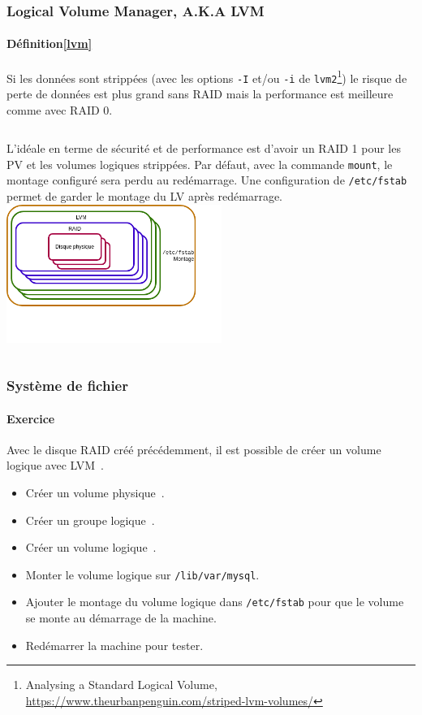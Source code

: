 \documentclass{beamer}
\begin{document}
    \begin{frame}
        \transdissolve
        \frametitle{Logical Volume Manager, A.K.A LVM}
        \framesubtitle{Définition\cref{lvm}}
        Si les données sont strippées (avec les options \lstinline{-I} et/ou \lstinline{-i} de \lstinline{lvm2}\footnote{Analysing a Standard Logical Volume, \url{https://www.theurbanpenguin.com/striped-lvm-volumes/}}) le risque de perte de données est plus grand sans RAID mais la performance est meilleure comme avec RAID 0.
        \bigbreak
        \begin{columns}
            L'idéale en terme de sécurité et de performance est d'avoir un RAID 1 pour les PV et les volumes logiques strippées.
            \bigbreak
            Par défaut, avec la commande \lstinline{mount}, le montage configuré sera perdu au redémarrage.
            Une configuration de \lstinline{/etc/fstab} permet de garder le montage du LV après redémarrage.
            \bigbreak
            \centering
            \includegraphics[width=7cm]{image/fs-stack.drawio}
        \end{columns}
    \end{frame}

    \begin{frame}
        \transdissolve
        \frametitle{Système de fichier}
        \framesubtitle{Exercice \execcounterdispinc}
        Avec le disque RAID créé précédemment, il est possible de créer un volume logique avec LVM~.
        \begin{itemize}
            \item Créer un volume physique~.
            \item Créer un groupe logique~.
            \item Créer un volume logique~.
            \item Monter le volume logique sur \lstinline{/lib/var/mysql}.
            \item Ajouter le montage du volume logique dans \lstinline{/etc/fstab} pour que le volume se monte au démarrage de la machine.
            \item Redémarrer la machine pour tester.
        \end{itemize}
    \end{frame}
\end{document}
